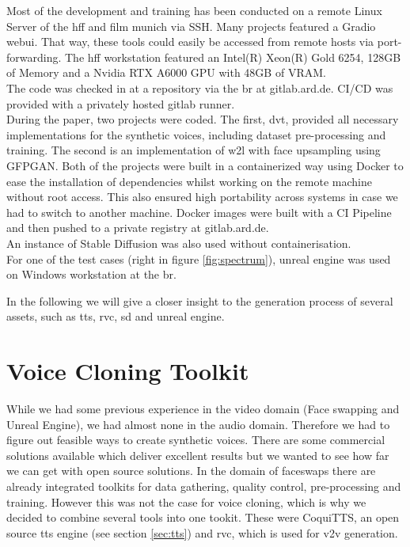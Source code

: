\documentclass[
  a4paper,  %
  twoside,  %
  bibliography=totoc,
  headsepline,
  cleardoublepage=empty,
  parskip=half,
  draft=false
]{scrbook}
\begin{document}
Most of the development and training has been conducted on a remote Linux Server of the \gls{hff} and film munich via SSH. Many projects featured a Gradio webui. That way, these tools could easily be accessed from remote hosts via port-forwarding. The \gls{hff} workstation featured an Intel(R) Xeon(R) Gold 6254, 128GB of Memory and a Nvidia RTX A6000 GPU with 48GB of VRAM. \\
The code was checked in at a repository via the \gls{br} at gitlab.ard.de. CI/CD was provided with a privately hosted gitlab runner. \\
During the paper, two projects were coded. The first, \gls{dvt}, provided all necessary implementations for the synthetic voices, including dataset pre-processing and training. The second is an implementation of \gls{w2l} with face upsampling using GFPGAN. Both of the projects were built in a containerized way using Docker to ease the installation of dependencies whilst working on the remote machine without root access. This also ensured high portability across systems in case we had to switch to another machine. Docker images were built with a CI Pipeline and then pushed to a private registry at gitlab.ard.de. \\
An instance of Stable Diffusion was also used without containerisation.  \\
For one of the test cases (right in figure \ref{fig:spectrum}), unreal engine was used on Windows workstation at the \gls{br}.

In the following we will give a closer insight to the generation process of several assets, such as \gls{tts}, \gls{rvc}, \gls{sd} and unreal engine.

\section{Voice Cloning Toolkit}
\label{sec:dvt}
While we had some previous experience in the video domain (Face swapping and Unreal Engine), we had almost none in the audio domain. Therefore we had to figure out feasible ways to create synthetic voices. There are some commercial solutions available which deliver excellent results but we wanted to see how far we can get with open source solutions. In the domain of faceswaps there are already integrated toolkits for data gathering, quality control, pre-processing and training. However this was not the case for voice cloning, which is why we decided to combine several tools into one tookit. These were CoquiTTS, an open source \gls{tts} engine (see section \ref{sec:tts}) and \gls{rvc}, which is used for \gls{v2v} generation. 
\end{document}
